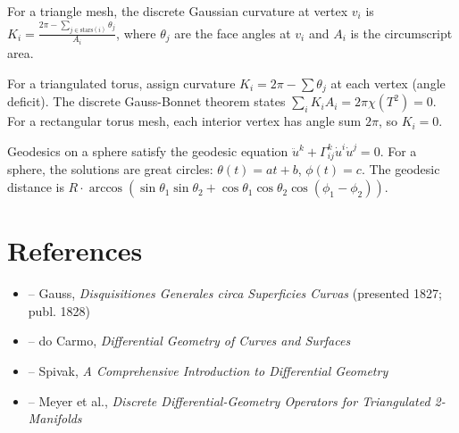 \begin{solution}
For a triangle mesh, the discrete Gaussian curvature at vertex $v_i$ is $K_i = \frac{2\pi - \sum_{j \in \text{stars}(i)} \theta_j}{A_i}$, where $\theta_j$ are the face angles at $v_i$ and $A_i$ is the circumscript area.
\end{solution}

\begin{solution}
For a triangulated torus, assign curvature $K_i = 2\pi - \sum \theta_j$ at each vertex (angle deficit). The discrete Gauss-Bonnet theorem states $\sum_i K_i A_i = 2\pi\chi(T^2) = 0$. For a rectangular torus mesh, each interior vertex has angle sum $2\pi$, so $K_i = 0$.
\end{solution}

\begin{solution}
Geodesics on a sphere satisfy the geodesic equation $\ddot{u}^k + \Gamma_{ij}^k \dot{u}^i \dot{u}^j = 0$. For a sphere, the solutions are great circles: $\theta(t) = at + b$, $\phi(t) = c$. The geodesic distance is $R \cdot \arccos(\sin\theta_1\sin\theta_2 + \cos\theta_1\cos\theta_2\cos(\phi_1-\phi_2))$.
\end{solution}


\section{References}

\begin{itemize}
    \item \cite{gauss-disquisitiones-generales} -- Gauss, \textit{Disquisitiones Generales circa Superficies Curvas} (presented 1827; publ. 1828)
    \item \cite{do-carmo} -- do Carmo, \textit{Differential Geometry of Curves and Surfaces}
    \item \cite{spivak-dg} -- Spivak, \textit{A Comprehensive Introduction to Differential Geometry}
    \item \cite{meyer-discrete} -- Meyer et al., \textit{Discrete Differential-Geometry Operators for Triangulated 2-Manifolds}
\end{itemize}